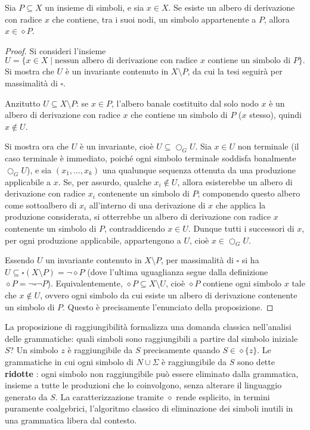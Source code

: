 \begin{proposition}[Raggiungibilità]
  Sia \(P \subseteq X\) un insieme di simboli, e sia \(x \in X\). Se esiste un albero di derivazione con radice \(x\) che contiene, tra i suoi nodi, un simbolo appartenente a \(P\), allora \(x \in \diamond P\).
\end{proposition}

\begin{proof}
  Si consideri l'insieme \[U = \{x \in X \mid \text{nessun albero di derivazione con radice } x \text{ contiene un simbolo di } P\}.\] Si mostra che \(U\) è un invariante contenuto in \(X \setminus P\), da cui la tesi seguirà per massimalità di \(\square\).

  Anzitutto \(U \subseteq X \setminus P\): se \(x \in P\), l'albero banale costituito dal solo nodo \(x\) è un albero di derivazione con radice \(x\) che contiene un simbolo di \(P\) (\(x\) stesso), quindi \(x \notin U\).

  Si mostra ora che \(U\) è un invariante, cioè \(U \subseteq \bigcirc_G U\). Sia \(x \in U\) non terminale (il caso terminale è immediato, poiché ogni simbolo terminale soddisfa banalmente \(\bigcirc_G U\)), e sia \((x_1, \ldots, x_k)\) una qualunque sequenza ottenuta da una produzione applicabile a \(x\). Se, per assurdo, qualche \(x_i \notin U\), allora esisterebbe un albero di derivazione con radice \(x_i\) contenente un simbolo di \(P\); componendo questo albero come sottoalbero di \(x_i\) all'interno di una derivazione di \(x\) che applica la produzione considerata, si otterrebbe un albero di derivazione con radice \(x\) contenente un simbolo di \(P\), contraddicendo \(x \in U\). Dunque tutti i successori di \(x\), per ogni produzione applicabile, appartengono a \(U\), cioè \(x \in \bigcirc_G U\).

  Essendo \(U\) un invariante contenuto in \(X \setminus P\), per massimalità di \(\square\) si ha \(U \subseteq \square(X \setminus P) = \neg \diamond P\) (dove l'ultima uguaglianza segue dalla definizione \(\diamond P = \neg \square \neg P\)). Equivalentemente, \(\diamond P \subseteq X \setminus U\), cioè \(\diamond P\) contiene ogni simbolo \(x\) tale che \(x \notin U\), ovvero ogni simbolo da cui esiste un albero di derivazione contenente un simbolo di \(P\). Questo è precisamente l'enunciato della proposizione.
\end{proof}

La proposizione di raggiungibilità formalizza una domanda classica nell'analisi delle grammatiche: quali simboli sono raggiungibili a partire dal simbolo iniziale \(S\)? Un simbolo \(z\) è raggiungibile da \(S\) precisamente quando \(S \in \diamond \{z\}\). Le grammatiche in cui ogni simbolo di \(N \cup \Sigma\) è raggiungibile da \(S\) sono dette \textbf{ridotte} \cite{hopcroft2006,aho1986}: ogni simbolo non raggiungibile può essere eliminato dalla grammatica, insieme a tutte le produzioni che lo coinvolgono, senza alterare il linguaggio generato da \(S\). La caratterizzazione tramite \(\diamond\) rende esplicito, in termini puramente coalgebrici, l'algoritmo classico di eliminazione dei simboli inutili in una grammatica libera dal contesto.

